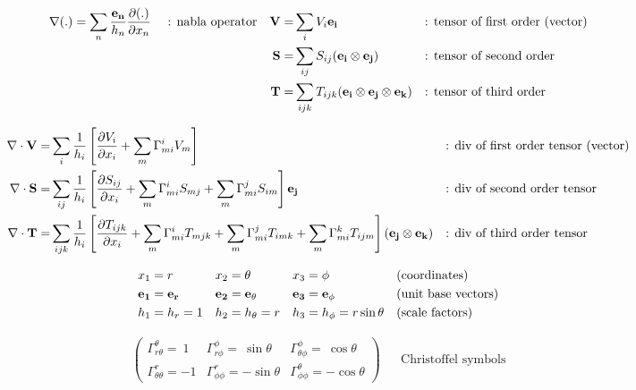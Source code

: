 \documentclass[10pt,paper=a4]{report}
\begin{document}
\fontsize{9pt}{20pt}

\begin{align}
\nabla (.) = \sum_n \frac{{\bf{e_n}}}{h_n}\frac{\partial (.)}{\partial x_n} \ \ \ \ \mbox{: nabla operator} & & {\bf{V}} = &  \sum_i V_i {\bf{{e_i}}} & & \mbox{: tensor of first order (vector)}\\
& & {\bf{S}} = &  \sum_{ij} S_{ij} ({\bf{e_i}} \otimes {\bf{e_j}}) & & {\mbox{: tensor of second order}}\\
& & {\bf{T}} = &  \sum_{ijk} T_{ijk} ({\bf{e_i}} \otimes {\bf{e_j}} \otimes {\bf{e_k}}) & & \mbox{: tensor of third order}
\end{align}

\begin{align}
\nabla \cdot {\bf{V}} = & \sum_i \frac{1}{h_i} \left[ \frac{\partial V_i}{\partial x_i} + \sum_m \Gamma_{mi}^i V_m \right] & & \mbox{: div of first order tensor (vector)} \\
\nabla \cdot {\bf{S}} = & \sum_{ij} \frac{1}{h_i} \left[ \frac{\partial S_{ij}}{\partial x_i} + \sum_m \Gamma_{mi}^i S_{mj} + \sum_m \Gamma_{mi}^j S_{im} \right] {\bf{e_j}} & & \mbox{: div of second order tensor} \\
\nabla \cdot {\bf{T}} = & \sum_{ijk} \frac{1}{h_i} \left[ \frac{\partial T_{ijk}}{\partial x_i} + \sum_m \Gamma_{mi}^i T_{mjk} + \sum_m \Gamma_{mi}^j T_{imk} + \sum_m \Gamma_{mi}^k T_{ijm} \right]  ({\bf{e_j}} \otimes {\bf{e_k}}) & & \mbox{: div of third order tensor}
\end{align}

\begin{align}
& x_1 = r & & x_2 = \theta & & x_3 = \phi & & \mbox{(coordinates)} \\
& {\bf{e_1 = e_r}} & &  {\bf{e_2 = e_\theta}} & & {\bf{e_3 = e_\phi}} && \mbox{(unit base vectors)} \\
& h_1 = h_r = 1 & &  h_2 = h_\theta = r & & h_3 = h_\phi = r \sin{\theta} & & \mbox{(scale factors)}
\end{align}

\begin{align}
\begin{pmatrix}
\Gamma_{r\theta}^\theta = \ 1  &  \Gamma_{r\phi}^\phi = \ \sin{\theta} & \Gamma_{\theta \phi}^{\phi} = \ \cos{\theta}   \\
\Gamma_{\theta \theta}^r = -1   &  \Gamma_{\phi \phi}^r = -\sin{\theta}  & \Gamma_{\phi \phi}^{\theta} = -\cos{\theta}  
\end{pmatrix} &&  \mbox{Christoffel symbols}
\end{align}
\end{document}
